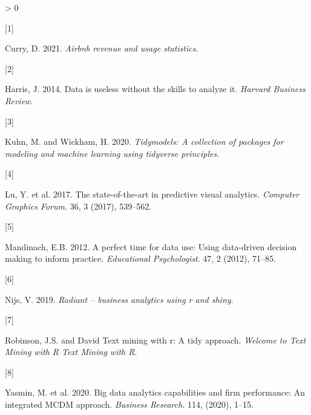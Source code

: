 \documentclass{acm_proc_article-sp}
\newlength{\csllabelwidth}
\newlength{\cslhangindent}
\newenvironment{CSLReferences}[3] %
 {%
  \setlength{\parindent}{0pt}
  \ifodd #1 \everypar{\setlength{\hangindent}{\cslhangindent}}\ignorespaces\fi
  \ifnum #2 > 0
  \setlength{\parskip}{#2\baselineskip}
  \fi
 }%
 {}
\newcommand{\CSLLeftMargin}[1]{\parbox[t]{\csllabelwidth}{#1}}
\newcommand{\CSLRightInline}[1]{\parbox[t]{\linewidth - \csllabelwidth}{#1}}
\begin{document}
\hypertarget{refs}{}
\begin{CSLReferences}{0}{0}
\leavevmode\hypertarget{ref-airbnb2021}{}%
\CSLLeftMargin{{[}1{]} }
\CSLRightInline{Curry, D. 2021. \emph{Airbnb revenue and usage
statistics}.}

\leavevmode\hypertarget{ref-harris_2014}{}%
\CSLLeftMargin{{[}2{]} }
\CSLRightInline{Harris, J. 2014. Data is useless without the skills to
analyze it. \emph{Harvard Business Review}.}

\leavevmode\hypertarget{ref-tidymodels2020}{}%
\CSLLeftMargin{{[}3{]} }
\CSLRightInline{Kuhn, M. and Wickham, H. 2020. \emph{Tidymodels: A
collection of packages for modeling and machine learning using tidyverse
principles.}}

\leavevmode\hypertarget{ref-https:ux2fux2fdoi.orgux2f10.1111ux2fcgf.13210}{}%
\CSLLeftMargin{{[}4{]} }
\CSLRightInline{Lu, Y. et al. 2017. The state-of-the-art in predictive
visual analytics. \emph{Computer Graphics Forum}. 36, 3 (2017),
539--562.}

\leavevmode\hypertarget{ref-doi:10.1080ux2f00461520.2012.667064}{}%
\CSLLeftMargin{{[}5{]} }
\CSLRightInline{Mandinach, E.B. 2012. A perfect time for data use: Using
data-driven decision making to inform practice. \emph{Educational
Psychologist}. 47, 2 (2012), 71--85.}

\leavevmode\hypertarget{ref-radiant2019}{}%
\CSLLeftMargin{{[}6{]} }
\CSLRightInline{Nijs, V. 2019. \emph{Radiant -- business analytics using
r and shiny}.}

\leavevmode\hypertarget{ref-robinson}{}%
\CSLLeftMargin{{[}7{]} }
\CSLRightInline{Robinson, J.S. and David Text mining with r: A tidy
approach. \emph{Welcome to Text Mining with R \textbar{} Text Mining
with R}.}

\leavevmode\hypertarget{ref-https:ux2fux2fdoi.orgux2f10.1016ux2fj.jbusres.2020.03.028}{}%
\CSLLeftMargin{{[}8{]} }
\CSLRightInline{Yasmin, M. et al. 2020. Big data analytics capabilities
and firm performance: An integrated MCDM approach. \emph{Business
Research}. 114, (2020), 1--15.}

\end{CSLReferences}
\setlength{\parindent}{0in}
\end{document}
